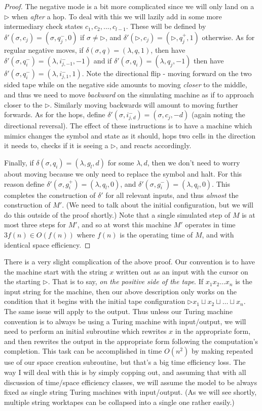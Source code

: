 \begin{proof}
	The negative mode is a bit more complicated since we will only land on a $\triangleright$ when \textit{after} a hop. To deal with this we will lazily add in some more intermediary check states $c_1,c_2,...,c_{l-1}$. These will be defined by $\delta'(\sigma,c_j) = (\sigma,q_j^-,0)$ if $\sigma \neq \triangleright$, and $\delta'(\triangleright,c_j) = (\triangleright,q_j^+,1)$ otherwise. As for regular negative moves, if $\delta(\sigma,q) = (\lambda,q,1)$, then have $\delta'(\sigma,q_i^-) = (\lambda,i_{j,-1}^-,-1)$ and if $\delta'(\sigma,q_i) = (\lambda,q_j,-1)$ then have $\delta'(\sigma,q_i^-) = (\lambda,i_{j,1}^-,1)$. Note the directional flip - moving forward on the two sided tape while on the negative side amounts to moving \textit{closer} to the middle, and thus we need to move \textit{backward} on the simulating machine as if to approach closer to the $\triangleright$. Similarly moving backwards will amount to moving further forwards. As for the hops, define $\delta'(\sigma,i_{j,d}^-) = (\sigma,c_j,-d)$ (again noting the directional reversal). The effect of these instructions is to have a machine which mimics changes the symbol and state as it should, hops two cells in the direction it needs to, checks if it is seeing a $\triangleright$, and reacts accordingly.

	Finally, if $\delta(\sigma,q_i) = (\lambda,g_l,d)$ for some $\lambda,d$, then we don't need to worry about moving because we only need to replace the symbol and halt. For this reason define $\delta'(\sigma,g_i^+) = (\lambda,q_l,0)$, and $\delta'(\sigma,g_i^-) = (\lambda,q_l,0)$. This completes the construction of $\delta'$ for all relevant inputs, and thus \textit{almost} the construction of $M'$. 
(We need to talk about the initial configuration, but we will do this outside of the proof shortly.) Note that a single simulated step of $M$ is at most three steps for $M'$, and so at worst this machine $M'$ operates in time $3f(n) \in O(f(n))$ where $f(n)$ is the operating time of $M$, and with identical space efficiency.	
\end{proof}
There is a very slight complication of the above proof. Our convention is to have the machine start with the string $x$ written out as an input with the cursor on the starting $\triangleright$. That is to say, \textit{on the positive side of the tape}. If $x_1 x_2 \ldots x_n$ is the input string for the machine, then our above description only works on the condition that it begins with the initial tape configuration $\triangleright x_1 \sqcup x_2 \sqcup \ldots \sqcup x_n$. The same issue will apply to the output. Thus unless our Turing machine convention is to always be using a Turing machine with input/output, we will need to perform an initial subroutine which rewrites $x$ in the appropriate form, and then rewrites the output in the appropriate form following the computation's completion. This task can be accomplished in time $O(n^2)$ by making repeated use of our space creation subroutine, but that's a big time efficiency loss. The way I will deal with this is by simply copping out, and assuming that with all discussion of time/space efficiency classes, we will assume the model to be always fixed as single string Turing machines with input/output. (As we will see shortly, multiple string worktapes can be collapsed into a single one rather easily.)
